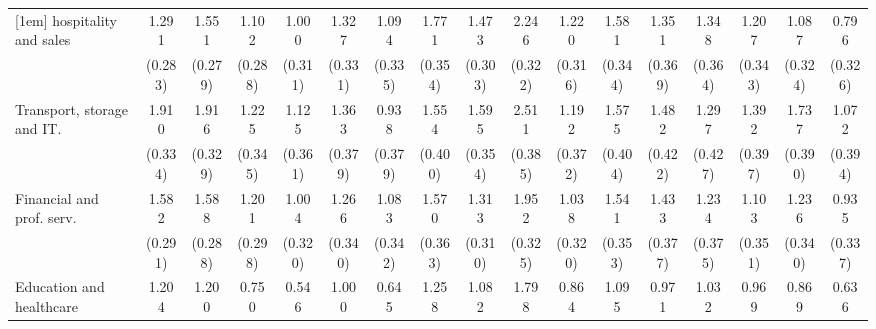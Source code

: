 {\begin{tabular}{l*{16}{c}}
[1em]
hospitality and sales&       1.291\sym{***}&       1.551\sym{***}&       1.102\sym{***}&       1.000\sym{**} &       1.327\sym{***}&       1.094\sym{**} &       1.771\sym{***}&       1.473\sym{***}&       2.246\sym{***}&       1.220\sym{***}&       1.581\sym{***}&       1.351\sym{***}&       1.348\sym{***}&       1.207\sym{***}&       1.087\sym{***}&       0.796\sym{*}  \\
                    &     (0.283)         &     (0.279)         &     (0.288)         &     (0.311)         &     (0.331)         &     (0.335)         &     (0.354)         &     (0.303)         &     (0.322)         &     (0.316)         &     (0.344)         &     (0.369)         &     (0.364)         &     (0.343)         &     (0.324)         &     (0.326)         \\
[1em]
Transport, storage and IT.&       1.910\sym{***}&       1.916\sym{***}&       1.225\sym{***}&       1.125\sym{**} &       1.363\sym{***}&       0.938\sym{*}  &       1.554\sym{***}&       1.595\sym{***}&       2.511\sym{***}&       1.192\sym{**} &       1.575\sym{***}&       1.482\sym{***}&       1.297\sym{**} &       1.392\sym{***}&       1.737\sym{***}&       1.072\sym{**} \\
                    &     (0.334)         &     (0.329)         &     (0.345)         &     (0.361)         &     (0.379)         &     (0.379)         &     (0.400)         &     (0.354)         &     (0.385)         &     (0.372)         &     (0.404)         &     (0.422)         &     (0.427)         &     (0.397)         &     (0.390)         &     (0.394)         \\
[1em]
Financial and prof. serv.&       1.582\sym{***}&       1.588\sym{***}&       1.201\sym{***}&       1.004\sym{**} &       1.266\sym{***}&       1.083\sym{**} &       1.570\sym{***}&       1.313\sym{***}&       1.952\sym{***}&       1.038\sym{**} &       1.541\sym{***}&       1.433\sym{***}&       1.234\sym{***}&       1.103\sym{**} &       1.236\sym{***}&       0.935\sym{**} \\
                    &     (0.291)         &     (0.288)         &     (0.298)         &     (0.320)         &     (0.340)         &     (0.342)         &     (0.363)         &     (0.310)         &     (0.325)         &     (0.320)         &     (0.353)         &     (0.377)         &     (0.375)         &     (0.351)         &     (0.340)         &     (0.337)         \\
[1em]
Education and healthcare&       1.204\sym{***}&       1.200\sym{***}&       0.750\sym{*}  &       0.546         &       1.000\sym{**} &       0.645         &       1.258\sym{***}&       1.082\sym{***}&       1.798\sym{***}&       0.864\sym{**} &       1.095\sym{**} &       0.971\sym{**} &       1.032\sym{**} &       0.969\sym{**} &       0.869\sym{**} &       0.636         \\

\end{tabular}}
